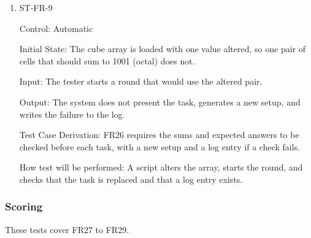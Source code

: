 \documentclass[12pt, titlepage]{article}
\begin{document}
\begin{enumerate}
\item{ST-FR-9\\}

Control: Automatic

Initial State: The cube array is loaded with one value altered, so one pair of cells that should sum to 1001 (octal) does not.

Input: The tester starts a round that would use the altered pair.

Output: The system does not present the task, generates a new setup, and writes the failure to the log.

Test Case Derivation: FR26 requires the sums and expected answers to be checked before each task, with a new setup and a log entry if a check fails.

How test will be performed: A script alters the array, starts the round, and checks that the task is replaced and that a log entry exists.

\end{enumerate}

\subsubsection{Scoring}

These tests cover FR27 to FR29.
\end{document}

